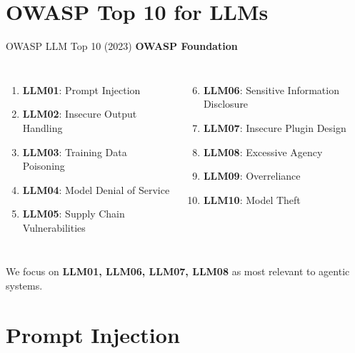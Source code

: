 \documentclass[aspectratio=169,10pt]{beamer}
\begin{document}
\section{OWASP Top 10 for LLMs}

\begin{frame}{OWASP LLM Top 10 (2023)}
  \textbf{OWASP Foundation}~\cite{owasp2023llm}
  \vspace{0.3em}
  \begin{columns}[T]
      \begin{enumerate}
        \item \textbf{LLM01}: Prompt Injection
        \item \textbf{LLM02}: Insecure Output Handling
        \item \textbf{LLM03}: Training Data Poisoning
        \item \textbf{LLM04}: Model Denial of Service
        \item \textbf{LLM05}: Supply Chain Vulnerabilities
      \end{enumerate}
      \begin{enumerate}
        \setcounter{enumi}{5}
        \item \textbf{LLM06}: Sensitive Information Disclosure
        \item \textbf{LLM07}: Insecure Plugin Design
        \item \textbf{LLM08}: Excessive Agency
        \item \textbf{LLM09}: Overreliance
        \item \textbf{LLM10}: Model Theft
      \end{enumerate}
  \end{columns}
  \vspace{0.4em}
  We focus on \textbf{LLM01, LLM06, LLM07, LLM08} as most relevant to agentic systems.
\end{frame}

\section{Prompt Injection}
\end{document}
